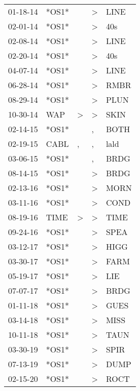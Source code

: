\begin{supertabular}{lllll}
 01-18-14 &  *OS1* &               &  \textgreater &  LINE \\
 02-01-14 &  *OS1* &               &  \textgreater &   40s \\
 02-08-14 &  *OS1* &               &  \textgreater &  LINE \\
 02-20-14 &  *OS1* &               &  \textgreater &   40s \\
 04-07-14 &  *OS1* &               &  \textgreater &  LINE \\
 06-28-14 &  *OS1* &               &  \textgreater &  RMBR \\
 08-29-14 &  *OS1* &               &  \textgreater &  PLUN \\
 10-30-14 &    WAP &  \textgreater &  \textgreater &  SKIN \\
 02-14-15 &  *OS1* &               &             , &  BOTH \\
 02-19-15 &   CABL &             , &             , &  lald \\
 03-06-15 &  *OS1* &               &             , &  BRDG \\
 08-14-15 &  *OS1* &               &  \textgreater &  BRDG \\
 02-13-16 &  *OS1* &               &  \textgreater &  MORN \\
 03-11-16 &  *OS1* &               &  \textgreater &  COND \\
 08-19-16 &   TIME &  \textgreater &  \textgreater &  TIME \\
 09-24-16 &  *OS1* &               &  \textgreater &  SPEA \\
 03-12-17 &  *OS1* &               &  \textgreater &  HIGG \\
 03-30-17 &  *OS1* &               &  \textgreater &  FARM \\
 05-19-17 &  *OS1* &               &  \textgreater &   LIE \\
 07-07-17 &  *OS1* &               &  \textgreater &  BRDG \\
 01-11-18 &  *OS1* &               &  \textgreater &  GUES \\
 03-14-18 &  *OS1* &               &  \textgreater &  MISS \\
 10-11-18 &  *OS1* &               &  \textgreater &  TAUN \\
 03-30-19 &  *OS1* &               &  \textgreater &  SPIR \\
 07-13-19 &  *OS1* &               &  \textgreater &  DUMP \\
 02-15-20 &  *OS1* &               &  \textgreater &  ROCT \\
\end{supertabular}
